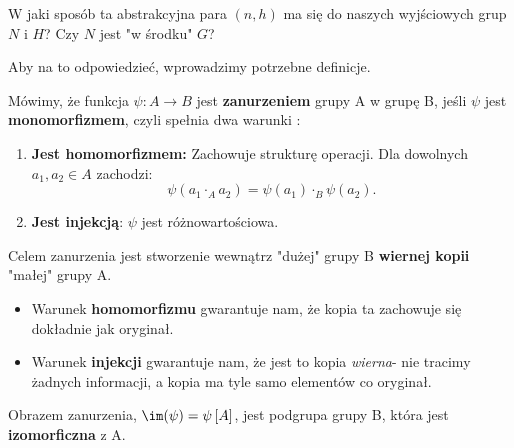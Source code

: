 \begin{question}
W jaki sposób ta abstrakcyjna para $(n,h)$ ma się do naszych wyjściowych grup $N$ i $H$? Czy $N$ jest "w środku" $G$?
\end{question}
Aby na to odpowiedzieć, wprowadzimy potrzebne definicje.
\begin{definition}
		
			Mówimy, że funkcja $\psi: A \rightarrow B$ jest \textbf{zanurzeniem} grupy A w grupę B, jeśli $\psi$ jest \textbf{monomorfizmem}, czyli spełnia dwa warunki			:
			\begin{enumerate}[label=\alph*)]
				\item \textbf{Jest homomorfizmem:} Zachowuje strukturę operacji. Dla dowolnych $a_1,a_2\in A$ zachodzi:
					\[
					\psi\left( a_1\cdot _{A}a_2 \right) = \psi\left( a_1 \right) \cdot _{B} \psi\left( a_2 \right) 
					.\] 
				\item \textbf{Jest injekcją}: $\psi$ jest różnowartościowa.
			\end{enumerate}
\end{definition}
\begin{intuition}

	Celem zanurzenia jest stworzenie wewnątrz "dużej" grupy B \textbf{wiernej kopii} "małej" grupy A.
	\begin{itemize}
		\item Warunek \textbf{homomorfizmu} gwarantuje nam, że kopia ta zachowuje się dokładnie jak oryginał.
		\item Warunek \textbf{injekcji} gwarantuje nam, że jest to kopia \textit{wierna}- nie tracimy żadnych informacji, a kopia ma tyle samo elementów co oryginał.
	\end{itemize}

	Obrazem zanurzenia, $\im(\psi) = \psi \left[ A \right]$, jest podgrupa grupy B, która jest  \textbf{izomorficzna} z A.
\end{intuition}
